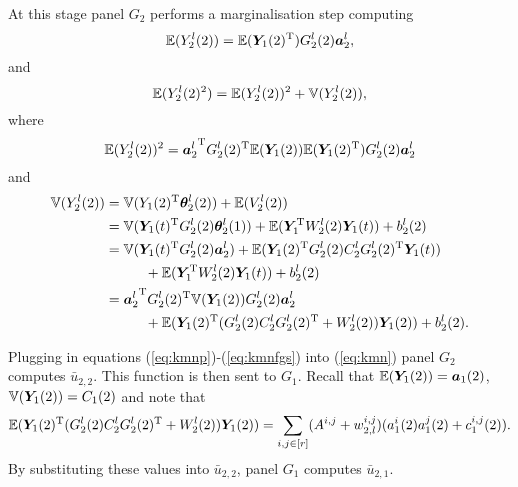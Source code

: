 At this stage panel $G_2$ performs a marginalisation step computing 
\begin{equation}
\mathbb{E}(Y_2^l(2))=\mathbb{E}(\bm{Y}_1(2)^{\textnormal{T}})G_2^l(2)\bm{a}_2^l,
\end{equation}
and
\begin{equation}
\mathbb{E}(Y_2^l(2)^2)=\mathbb{E}(Y_2^l(2))^2+\mathbb{V}(Y_2^l(2)),
\end{equation}
where
\begin{equation}
\mathbb{E}(Y_2^l(2))^2={\bm{a}_2^l}^{\textnormal{T}} G_2^l(2)^{\textnormal{T}} \mathbb{E}(\bm{Y}_1(2))\mathbb{E}(\bm{Y}_1(2)^{\textnormal{T}})G_2^l(2){\bm{a}_2^l}
\end{equation} 
and  
\begin{align}
\V(Y_2^l(2))&=\V(Y_1(2)^\T\bm{\theta}_{2}^l(2))+\E(V_2^l(2))\nonumber\\
&= \V(\bm{Y}_1(t)^\T G_2^l(2)\bm{\theta}_2^l(1))+\E(\bm{Y}_1^\T W_2^l(2)\bm{Y}_1(t))+b_2^l(2)\nonumber\\
&=\V(\bm{Y}_1(t)^\T G_2^l(2)\bm{a}_2^l)+\E(\bm{Y}_1(2)^\T G_{2}^l(2)C_2^lG_2^l(2)^\T \bm{Y}_1(t))\nonumber\\
&\hspace{1cm}+\E(\bm{Y}_1^\T W_2^l(2)\bm{Y}_1(t))+b_2^l(2)\nonumber\\
&= {\bm{a}_2^l}^\T G_2^l(2)^\T \V(\bm{Y}_1(2))G_2^l(2)\bm{a}_2^l\nonumber\\
&\hspace{1cm}+\E(\bm{Y}_1(2)^\T (G_{2}^l(2)C_2^lG_2^l(2)^\T+W_2^l(2)) \bm{Y}_1(2))
+b_2^l(2)\label{eq:kmnfgs}.
\end{align}

Plugging in equations (\ref{eq:kmnp})-(\ref{eq:kmnfgs}) into (\ref{eq:kmn}) panel $G_2$ computes $\bar{u}_{2,2}$. This function is then sent to $G_1$. Recall that $\mathbb{E}(\bm{Y}_1(2))=\bm{a}_1(2)$, $\mathbb{V}(\bm{Y}_1(2))=C_1(2)$ and note that 
\[
\mathbb{E}(\bm{Y}_1(2)^{\textnormal{T}} (G_{2}^l(2)C_2^lG_2^l(2)^{\textnormal{T}}+W_2^l(2)) \bm{Y}_1(2))= \sum_{i,j\in[r]}(A^{i,j}+w^{i,j}_{2,l})(a^i_1(2)a_1^j(2)+c_1^{i,j}(2)).
\]  
By substituting these values into $\bar{u}_{2,2}$, panel $G_1$ computes $\bar{u}_{2,1}$. 

